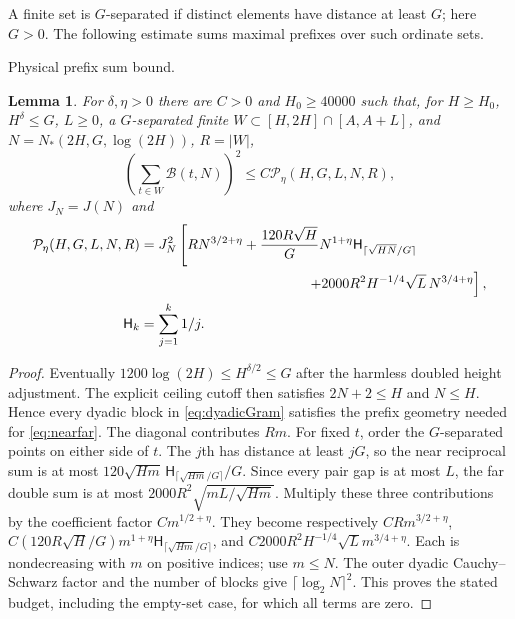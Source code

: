 \documentclass[11pt,a4paper]{article}
\numberwithin{equation}{section}
\newtheorem{lemma}[theorem]{Lemma}
\theoremstyle{definition}
\begin{document}
A finite set is $G$-separated if distinct elements have distance at least
$G$; here $G>0$. The following estimate sums maximal prefixes over such
ordinate sets.
\par\medskip\noindent Physical prefix sum bound.
\begin{lemma}\label{lem:prefixsum}
For $\delta,\eta>0$ there are $C>0$ and $H_0\ge40000$ such that, for
$H\ge H_0$, $H^\delta\le G$, $L\ge0$, a $G$-separated finite
$W\subset[H,2H]\cap[A,A+L]$, and
$N=N_*(2H,G,\log(2H))$, $R=|W|$,
\[
 \left(\sum_{t\in W}\mathscr B(t,N)\right)^2\le C\mathcal P_\eta(H,G,L,N,R),
\]
where $J_N=J(N)$ and
\begin{align*}
 \mathcal P_\eta(H,G,L,N,R)
 &=J_N^2\left[R N^{3/2+\eta}
  +\frac{120R\sqrt H}{G}N^{1+\eta}
       \mathsf H_{\lceil\sqrt{HN}/G\rceil}\right.\\
 &\hspace{42mm}\left.+2000R^2H^{-1/4}\sqrt L\,N^{3/4+\eta}\right],\\
 \mathsf H_k&=\sum_{j=1}^k1/j.
\end{align*}
\end{lemma}
\begin{proof}
Eventually $1200\log(2H)\le H^{\delta/2}\le G$ after the harmless doubled
height adjustment. The explicit ceiling cutoff then satisfies
$2N+2\le H$ and $N\le H$. Hence every dyadic block in
\eqref{eq:dyadicGram} satisfies the prefix geometry needed for
\eqref{eq:nearfar}. The diagonal contributes $Rm$. For fixed $t$, order the
$G$-separated points on either side of $t$. The $j$th has distance at least
$jG$, so the near reciprocal sum is at most
$120\sqrt{Hm}\,\mathsf H_{\lceil\sqrt{Hm}/G\rceil}/G$.
Since every pair gap is at most $L$, the far double sum is at most
$2000R^2\sqrt{mL/\sqrt{Hm}}$.
Multiply these three contributions by the coefficient factor
$Cm^{1/2+\eta}$. They become respectively
$CRm^{3/2+\eta}$,
$C(120R\sqrt H/G)m^{1+\eta}\mathsf H_{\lceil\sqrt{Hm}/G\rceil}$,
and $C2000R^2H^{-1/4}\sqrt Lm^{3/4+\eta}$.
Each is nondecreasing with $m$ on positive indices; use $m\le N$.
The outer dyadic Cauchy--Schwarz factor and the number of blocks give
$\lceil\log_2N\rceil^2$. This proves the stated budget, including the
empty-set case, for which all terms are zero.
\end{proof}
\end{document}
